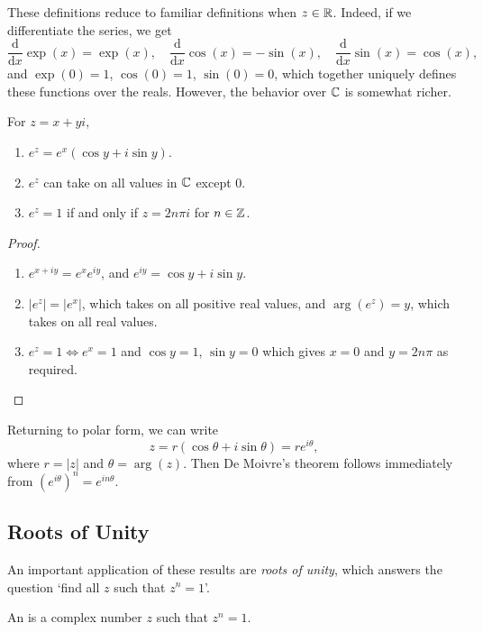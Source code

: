\documentclass[a4paper]{scrartcl}
\begin{document}
These definitions reduce to familiar definitions when $z \in \mathbb{R}$. Indeed, if we differentiate the series, we get
$$
	\frac{\mathrm{d}}{\mathrm{d}x} \exp(x) = \exp(x), \quad
	\frac{\mathrm{d}}{\mathrm{d}x}\cos(x) = -\sin(x), \quad
	\frac{\mathrm{d}}{\mathrm{d}x} \sin(x) = \cos(x),
$$
and $\exp(0) = 1$, $\cos(0) = 1$, $\sin(0) = 0$, which together uniquely defines these functions over the reals. However, the behavior over $\mathbb{C}$ is somewhat richer.

\begin{proposition}
	For $z = x + yi$,
	\begin{enumerate}[label=(\roman*)]
		\item $e^z = e^x(\cos y + i \sin y)$.
		\item $e^z$ can take on all values in $\mathbb{C}$ except 0.
		\item $e^z = 1$ if and only if $z = 2 n \pi i$ for $n \in \mathbb{Z}$. 
	\end{enumerate}
\end{proposition}
\begin{proof}\begin{enumerate}[label=(\roman*)]
	\item $e^{x + iy} = e^x e^{iy}$, and $e^{iy} = \cos y + i \sin y$.
	\item $|e^z| = |e^x|$, which takes on all positive real values, and $\arg(e^z) = y$, which takes on all real values.
	\item $e^z = 1 \iff e^x = 1$ and $\cos y = 1$, $\sin y = 0$ which gives $x = 0$ and $y = 2 n \pi$ as required. \qedhere
\end{enumerate}
\end{proof}

Returning to polar form, we can write
$$
z = r(\cos \theta + i \sin \theta) = re^{i \theta},
$$
where $r = |z|$ and $\theta = \arg(z)$. 
Then De Moivre's theorem follows immediately from $(e^{i \theta})^n = e^{i n \theta}$.


\subsection{Roots of Unity}

An important application of these results are \emph{roots of unity}, which answers the question `find all $z$ such that $z^n = 1$'.

\begin{definition}
	An  is a complex number $z$ such that $z^n = 1$.
\end{definition}
\end{document}
